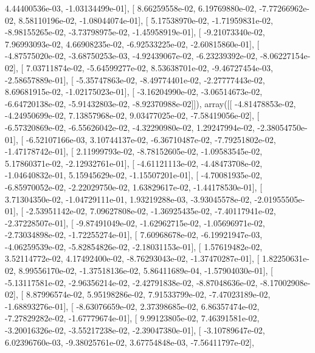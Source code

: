 \documentclass{article}
\begin{document}
          4.44400536e-03,  -1.03134499e-01],
       [  8.66259558e-02,   6.19769880e-02,  -7.77266962e-02,
          8.58110196e-02,  -1.08044074e-01],
       [  5.17538970e-02,  -1.71959831e-02,  -8.98155265e-02,
         -3.73798975e-02,  -1.45958919e-01],
       [ -9.21073340e-02,   7.96993093e-02,   4.66908235e-02,
         -6.92533225e-02,  -2.60815860e-01],
       [ -4.87575020e-02,  -3.68750253e-03,  -4.92439067e-02,
         -6.23239392e-02,  -8.06227154e-02],
       [  7.03711874e-02,  -5.64599277e-02,   8.53638701e-02,
         -9.46727454e-03,  -2.58657889e-01],
       [ -5.35747863e-02,  -8.49774401e-02,  -2.27777443e-02,
          8.69681915e-02,  -1.02175023e-01],
       [ -3.16204990e-02,  -3.06514673e-02,  -6.64720138e-02,
         -5.91432803e-02,  -8.92370988e-02]]), array([[ -4.81478853e-02,  -4.24950699e-02,   7.13857968e-02,
          9.03477025e-02,  -7.58419056e-02],
       [ -6.57320869e-02,  -6.55626042e-02,  -4.32290980e-02,
          1.29247994e-02,  -2.38054750e-01],
       [ -6.52107166e-03,   3.10744137e-02,  -6.36710487e-02,
         -7.79251802e-02,  -1.47178742e-01],
       [  2.11999793e-02,  -8.78152605e-02,  -1.09583545e-02,
          5.17860371e-02,  -2.12932761e-01],
       [ -4.61121113e-02,  -4.48473708e-02,  -1.04640832e-01,
          5.15945629e-02,  -1.15507201e-01],
       [ -4.70081935e-02,  -6.85970052e-02,  -2.22029750e-02,
          1.63829617e-02,  -1.44178530e-01],
       [  3.71304350e-02,  -1.04729111e-01,   1.93219288e-03,
         -3.93045578e-02,  -2.01955505e-01],
       [ -2.53951142e-02,   7.09627808e-02,  -1.36925435e-02,
         -7.40117941e-02,  -2.37228507e-01],
       [ -9.87491049e-02,  -1.62962715e-02,  -1.05696971e-02,
         -2.73034898e-02,  -1.72255274e-01],
       [  7.60968678e-02,  -6.19921947e-03,  -4.06259539e-02,
         -5.82854826e-02,  -2.18031153e-01],
       [  1.57619482e-02,   3.52114772e-02,   4.17492400e-02,
         -8.76293043e-02,  -1.37470287e-01],
       [  1.82250631e-02,   8.99556170e-02,  -1.37518136e-02,
          5.86411689e-04,  -1.57904030e-01],
       [ -5.13117581e-02,  -2.96356214e-02,  -2.42791838e-02,
         -8.87048636e-02,  -8.17002908e-02],
       [  8.87996574e-02,   5.95198286e-02,   7.91533799e-02,
         -7.47023189e-02,  -1.68893276e-01],
       [ -8.63076659e-02,   2.37398685e-02,   6.86357474e-02,
         -7.27829282e-02,  -1.67779674e-01],
       [  9.99123805e-02,   7.46391581e-02,  -3.20016326e-02,
         -3.55217238e-02,  -2.39047380e-01],
       [ -3.10789647e-02,   6.02396760e-03,  -9.38025761e-02,
          3.67754848e-03,  -7.56411797e-02],
\end{document}
